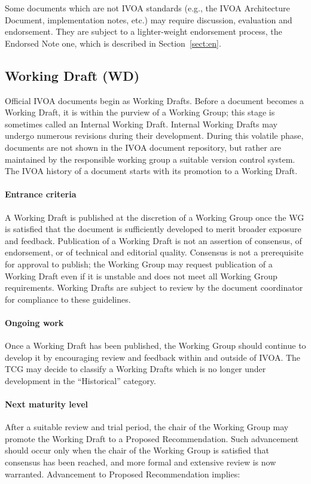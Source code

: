 \documentclass[11pt,a4paper]{ivoa}
\begin{document}
Some documents which are not IVOA standards (e.g., the IVOA Architecture
Document, implementation notes, etc.) may require discussion, evaluation
and endorsement. They are subject to a lighter-weight endorsement
process, the Endorsed Note one, which is described in
Section~\ref{sect:en}.

\subsection{Working Draft (WD)}

Official IVOA documents begin as Working Drafts.  Before a document
becomes a Working Draft, it is within the
purview of a Working Group; this stage is sometimes called an Internal
Working Draft.  Internal Working Drafts may undergo numerous
revisions during their development.  During this volatile phase, documents
are not shown in the IVOA document repository, but
rather are maintained by the responsible working group a suitable
version control system.  The IVOA history of a document starts with its
promotion to a Working Draft.

\paragraph{Entrance criteria}  A Working Draft is published at the discretion of a
Working Group once the WG is satisfied that the document is sufficiently
developed to merit broader exposure and feedback.  Publication of a
Working Draft is not an assertion of consensus, of endorsement, or of
technical and editorial quality. Consensus is not a prerequisite for
approval to publish; the Working Group may request publication of a
Working Draft even if it is unstable and does not meet all Working Group
requirements.  Working Drafts are subject to review by the document
coordinator for compliance to these guidelines.

\paragraph{Ongoing work}  Once a Working Draft has been published, the Working
Group should continue to develop it by encouraging review and feedback
within and outside of IVOA.  The TCG may decide to classify a Working
Drafts which is no longer under development in the “Historical”
category.

\paragraph{Next maturity level}  After a suitable review and trial period, the
chair of the Working Group may promote the Working Draft to a Proposed
Recommendation.  Such advancement should occur only when the chair of
the Working Group is satisfied that consensus has been reached, and more
formal and extensive review is now warranted.  Advancement to Proposed
Recommendation implies:
\end{document}
